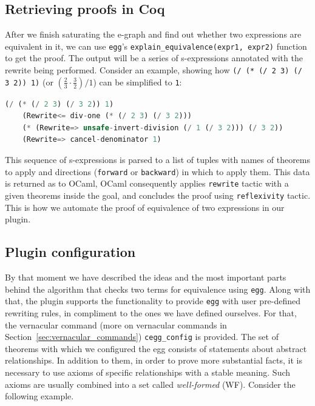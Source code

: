 \subsection{Retrieving proofs in Coq}
After we finish saturating the e-graph and find out whether two expressions are equivalent in it, we can use \texttt{egg}'s \texttt{explain\_equivalence(expr1, expr2)} function to get the proof. The output will be a series of s-expressions annotated with the rewrite being performed. Consider an example, showing how \texttt{(/ (* (/ 2 3) (/ 3 2)) 1)} (or $(\frac{2}{3} \cdot \frac{3}{2}) / 1$) can be simplified to \texttt{1}:

\vspace{0.5cm}
\begin{lstlisting}[language=rust, style=colouredRust]
    (/ (* (/ 2 3) (/ 3 2)) 1)
    (Rewrite<= div-one (* (/ 2 3) (/ 3 2)))
    (* (Rewrite=> unsafe-invert-division (/ 1 (/ 3 2))) (/ 3 2))
    (Rewrite=> cancel-denominator 1)
\end{lstlisting}

This sequence of s-expressions is parsed to a list of tuples with names of theorems to apply and directions (\texttt{forward} or \texttt{backward}) in which to apply them. This data is returned as to OCaml, OCaml consequently applies \texttt{rewrite} tactic with a given theorems inside the goal, and concludes the proof using \texttt{reflexivity} tactic. This is how we automate the proof of equivalence of two expressions in our plugin.

\subsection{Plugin configuration}
By that moment we have described the ideas and the most important parts behind the algorithm that checks two terms for equivalence using \texttt{egg}. Along with that, the plugin supports the functionality to provide \texttt{egg} with user pre-defined rewriting rules, in compliment to the ones we have defined ourselves. For that, the vernacular command (more on vernacular commands in Section~\ref{sec:vernacular_commands}) \texttt{cegg\_config} is provided. The set of theorems with which we configured the egg consists of statements about abstract relationships. In addition to them, in order to prove more substantial facts, it is necessary to use axioms of specific relationships with a stable meaning. Such axioms are usually combined into a set called \emph{well-formed} (WF). Consider the following example.

